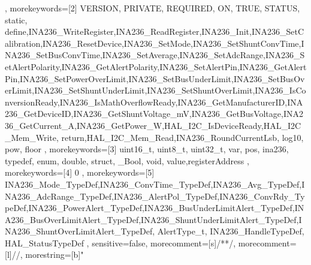 {{	},
	morekeywords=[2]{
		VERSION, PRIVATE, REQUIRED, ON, TRUE, STATUS, static, define,INA236_WriteRegister,INA236_ReadRegister,INA236_Init,INA236_SetCalibration,INA236_ResetDevice,INA236_SetMode,INA236_SetShuntConvTime,INA236_SetBusConvTime,INA236_SetAverage,INA236_SetAdcRange,INA236_SetAlertPolarity,INA236_GetAlertPolarity,INA236_SetAlertPin,INA236_GetAlertPin,INA236_SetPowerOverLimit,INA236_SetBusUnderLimit,INA236_SetBusOverLimit,INA236_SetShuntUnderLimit,INA236_SetShuntOverLimit,INA236_IsConversionReady,INA236_IsMathOverflowReady,INA236_GetManufacturerID,INA236_GetDeviceID,INA236_GetShuntVoltage_mV,INA236_GetBusVoltage,INA236_GetCurrent_A,INA236_GetPower_W,HAL_I2C_IsDeviceReady,HAL_I2C_Mem_Write, return,HAL_I2C_Mem_Read,INA236_RoundCurrentLsb, log10, pow, floor
	},
	morekeywords=[3]{ 
		uint16_t, uint8_t, uint32_t, var, pos, ina236, typedef, enum, double, struct, _Bool, void, value,registerAddress
	},
	morekeywords=[4]{ 
		0
	},
	morekeywords=[5]{
		INA236_Mode_TypeDef,INA236_ConvTime_TypeDef,INA236_Avg_TypeDef,INA236_AdcRange_TypeDef,INA236_AlertPol_TypeDef,INA236_ConvRdy_TypeDef,INA236_PowerAlert_TypeDef,INA236_BusUnderLimitAlert_TypeDef,INA236_BusOverLimitAlert_TypeDef,INA236_ShuntUnderLimitAlert_TypeDef,INA236_ShuntOverLimitAlert_TypeDef, AlertType_t, INA236_HandleTypeDef, HAL_StatusTypeDef
	},
	sensitive=false,
	morecomment=[s]{/*}{*/},
	morecomment=[l]{//},
	morestring=[b]"
}


\newcommand\numberstyle[1]{%
	\footnotesize
	\color{codegray}%
	\ttfamily
	\ifnum#1<10 0\fi#1 |%
}
